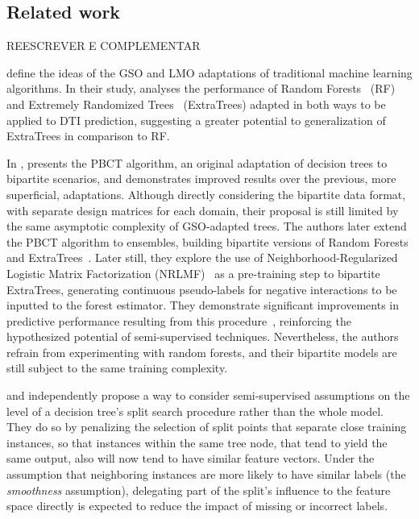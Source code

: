 \begin{itemize}


\section{Related work}
\label{sec:related_work}

REESCREVER E COMPLEMENTAR  %


\cite{schrynemackers2015classifying} define the ideas of the GSO and LMO adaptations of traditional machine learning algorithms. In their study, \cite{schrynemackers2015classifying} analyses the performance of Random Forests~\citep{breiman2001random} (RF) and Extremely Randomized Trees~\citep{geurts2006extremely} (ExtraTrees) adapted in both ways to be applied to DTI prediction, suggesting a greater potential to generalization of ExtraTrees in comparison to RF.

In \citeyear{pliakos2018global}, \cite{pliakos2018global} presents the PBCT algorithm, an original adaptation of decision trees to bipartite scenarios, and demonstrates improved results over the previous, more superficial, adaptations. Although directly considering the bipartite data format, with separate design matrices for each domain, their proposal is still limited by the same asymptotic complexity of GSO-adapted trees.
The authors later extend the PBCT algorithm to ensembles, building bipartite versions of Random Forests and ExtraTrees~\cite{pliakos2019network}. Later still, they explore the use of Neighborhood-Regularized Logistic Matrix Factorization (NRLMF)~\citep{liu2016neighborhood} as a pre-training step to bipartite ExtraTrees, generating continuous pseudo-labels for negative interactions to be inputted to the forest estimator. They demonstrate significant improvements in predictive performance resulting from this procedure~\cite{pliakos2019network}, reinforcing the hypothesized potential of semi-supervised techniques. Nevertheless, the authors refrain from experimenting with random forests, and their bipartite models are still subject to the same training complexity.

\cite{levatic2017semisupervised} and {} independently propose a way to consider semi-supervised assumptions on the level of a decision tree's split search procedure rather than the whole model. They do so by penalizing the selection of split points that separate close training instances, so that instances within the same tree node, that tend to yield the same output, also will now tend to have similar feature vectors. Under the assumption that neighboring instances are more likely to have similar labels (the \emph{smoothness} assumption), delegating part of the split's influence to the feature space directly is expected to reduce the impact of missing or incorrect labels. 


\end{itemize}
